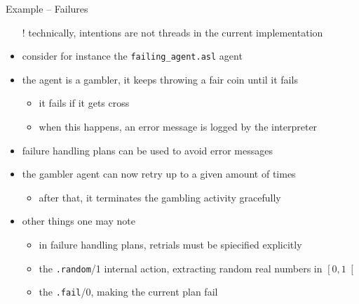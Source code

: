 \documentclass[presentation]{beamer}\mode<presentation>{\usetheme{AMSBolognaFC}}
\begin{document}
\begin{frame}[c, allowframebreaks]{Example \theJasonExample{} -- Failures}
\begin{itemize}
        \vspace{.3cm}
        
        \item[!] technically, intentions are \alert{not} threads in the current \jason{} implementation
        
        \framebreak
        
        \item consider for instance the \texttt{failing\_agent.asl} agent
        
        
        \vspace{.3cm}
        
        \item the agent is a gambler, it keeps throwing a fair coin until it fails
        \begin{itemize}
            \item it fails if it gets cross 
            \item when this happens, an error message is logged by the interpreter
        \end{itemize}
        
        \vspace{.3cm}
        
        \item failure handling plans can be used to avoid error messages
        
        
        \vspace{.3cm}
        
        \item the gambler agent can now retry up to a given amount of times
        \begin{itemize}
            \item after that, it terminates the gambling activity \alert{gracefully}
        \end{itemize}
        
        \framebreak
        
        \item other things one may note
        \begin{itemize}
            \item in failure handling plans, retrials must be spiecified \alert{explicitly}
            \item the \alert{\texttt{.random}/1} internal action, extracting random real numbers in $\left[0,1\right[$
            \item the \alert{\texttt{.fail}/0}, making the current plan fail
        \end{itemize}
        

\end{itemize}
\end{frame}
\end{document}
